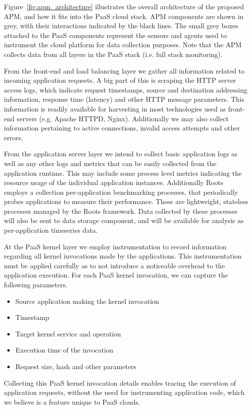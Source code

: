 Figure~\ref{fig:apm_architecture} illustrates the overall architecture of the proposed APM, and how 
it fits into the PaaS cloud stack. APM components are shown in grey, with their interactions indicated
by the black lines. The small grey boxes attached to the PaaS components represent the sensors and
agents used to instrument the cloud platform for data collection purposes. Note that the APM collects
data from all layers in the PaaS stack (i.e. full stack monitoring).

From the front-end and load balancing layer we gather all information related to incoming application
requests. A big part of this is scraping the HTTP server access logs, which indicate request timestamps,
source and destination addressing information, response time (latency) and other HTTP message
parameters. This information is readily available for harvesting in most technologies used as front-end
servers (e.g. Apache HTTPD, Nginx). Additionally we may also collect information pertaining to active
connections, invalid access attempts and other errors.

From the application server layer we intend to collect basic application logs as well as any other logs and 
metrics that can be easily collected from the application runtime. This may include some process level
metrics indicating the resource usage of the individual application instances. Additionally Roots
employs a collection per-application benchmarking processes, that periodically probes applications
to measure their performance. These are lightweight, stateless processes managed by the Roots framework.
Data collected by these processes will also be sent to data storage component, and will be available
for analysis as per-application timeseries data.

At the PaaS kernel layer we employ instrumentation to record information regarding all kernel invocations
made by the applications. This instrumentation must be applied carefully as to not introduce a noticeable
overhead to the application execution. For each PaaS kernel invocation, we can capture the 
following parameters.
\begin{itemize}
\item Source application making the kernel invocation
\item Timestamp
\item Target kernel service and operation
\item Execution time of the invocation
\item Request size, hash and other parameters
\end{itemize}
Collecting this PaaS kernel invocation details enables tracing the execution of application 
requests, without the need for instrumenting application code, which we believe is a feature 
unique to PaaS clouds. 

